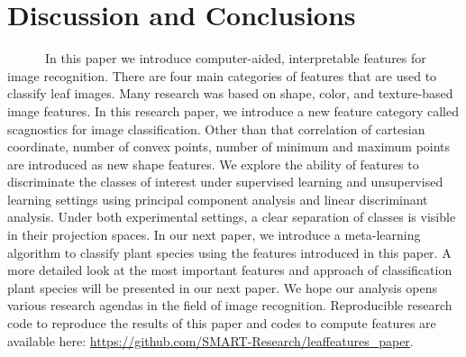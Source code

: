\documentclass{article}
\begin{document}
\hypertarget{discussion-and-conclusions}{%
\section{Discussion and Conclusions}\label{discussion-and-conclusions}}

~~~~~~In this paper we introduce computer-aided, interpretable features
for image recognition. There are four main categories of features that
are used to classify leaf images. Many research was based on shape,
color, and texture-based image features. In this research paper, we introduce a new feature category called scagnostics for image classification. Other than
that correlation of cartesian coordinate, number of convex points,
number of minimum and maximum points are introduced as new shape
features. We explore the ability of features to discriminate the classes
of interest under supervised learning and unsupervised learning settings
using principal component analysis and linear discriminant analysis.
Under both experimental settings, a clear separation of classes is visible
in their projection spaces. In our next paper, we introduce a
meta-learning algorithm to classify plant species using the features
introduced in this paper. A more detailed look at the most important
features and approach of classification plant species will be presented
in our next paper. We hope our analysis opens various research agendas
in the field of image recognition. Reproducible research code to
reproduce the results of this paper and codes to compute features are
available here: \url{https://github.com/SMART-Research/leaffeatures_paper}.



\end{document}
